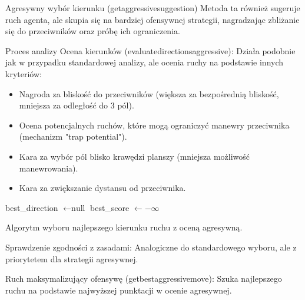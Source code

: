 \documentclass[12pt,a4paper]{article}
\begin{document}
Agresywny wybór kierunku (get\textunderscore aggressive\textunderscore suggestion)
Metoda ta również sugeruje ruch agenta, ale skupia się na bardziej ofensywnej strategii, nagradzając zbliżanie się do przeciwników oraz próbę ich ograniczenia.

Proces analizy
Ocena kierunków (\textunderscore evaluate\textunderscore directions\textunderscore aggressive):
Działa podobnie jak w przypadku standardowej analizy, ale ocenia ruchy na podstawie innych kryteriów:
\begin{itemize}
    \item Nagroda za bliskość do przeciwników (większa za bezpośrednią bliskość, mniejsza za odległość do 3 pól).
    \item Ocena potencjalnych ruchów, które mogą ograniczyć manewry przeciwnika (mechanizm "trap potential").
    \item Kara za wybór pól blisko krawędzi planszy (mniejsza możliwość manewrowania).
    \item Kara za zwiększanie dystansu od przeciwnika.
\end{itemize}

\begin{algorithm}[H]

best\_direction $\gets \text{null}$\;
best\_score $\gets -\infty$\;


\;

\caption{Algorytm wyboru najlepszego kierunku ruchu z oceną agresywną.}
\end{algorithm}


Sprawdzenie zgodności z zasadami:
Analogiczne do standardowego wyboru, ale z priorytetem dla strategii agresywnej.

Ruch maksymalizujący ofensywę (get\textunderscore best\textunderscore aggressive\textunderscore move):
Szuka najlepszego ruchu na podstawie najwyższej punktacji w ocenie agresywnej.
\end{document}
